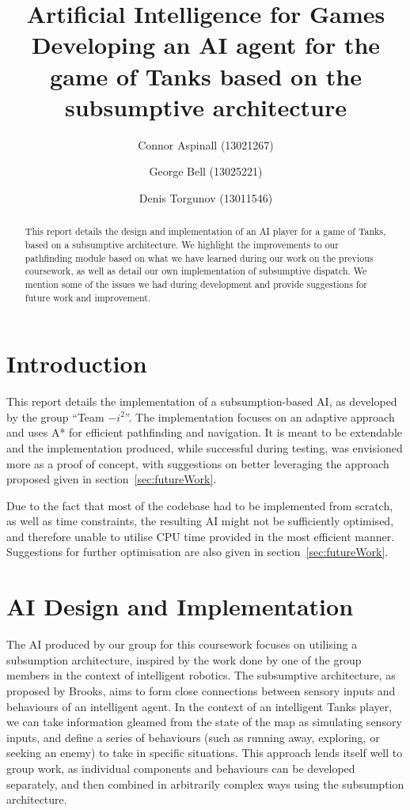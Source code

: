 \documentclass[11pt]{article}
\title{Artificial Intelligence for Games\\
Developing an AI agent for the game of Tanks based on the subsumptive architecture}
\author{Connor Aspinall (13021267) \and George Bell (13025221) \and Denis Torgunov (13011546)}
\date{}
\begin{document}
\newcommand{\includecode}[2][c]{<!---->}
\maketitle
\begin{abstract}
  This report details the design and implementation of an AI player for a game of Tanks, based on a subsumptive architecture. We highlight the improvements to our pathfinding module based on what we have learned during our work on the previous coursework, as well as detail our own implementation of subsumptive dispatch. We mention some of the issues we had during development and provide suggestions for future work and improvement.
\end{abstract}
\tableofcontents
\thispagestyle{empty}

\newpage

\section{Introduction}
This report details the implementation of a subsumption-based AI, as developed by the group ``Team \(-i^2\)''. The implementation focuses on an adaptive approach and uses A* for efficient pathfinding and navigation. It is meant to be extendable and the implementation produced, while successful during testing, was envisioned more as a proof of concept, with suggestions on better leveraging the approach proposed given in section~\ref{sec:futureWork}.

Due to the fact that most of the codebase had to be implemented from scratch, as well as time constraints, the resulting AI might not be sufficiently optimised, and therefore unable to utilise CPU time provided in the most efficient manner. Suggestions for further optimisation are also given in section~\ref{sec:futureWork}.

\section{AI Design and Implementation} \label{sec:design}

The AI produced by our group for this coursework focuses on utilising a subsumption architecture, inspired by the work done by one of the group members in the context of intelligent robotics. The subsumptive architecture, as proposed by Brooks, aims to form close connections between sensory inputs and behaviours of an intelligent agent\cite{brooks1}. In the context of an intelligent Tanks player, we can take information gleamed from the state of the map as simulating sensory inputs, and define a series of behaviours (such as running away, exploring, or seeking an enemy) to take in specific situations. This approach lends itself well to group work, as individual components and behaviours can be developed separately, and then combined in arbitrarily complex ways using the subsumption architecture.
\end{document}
